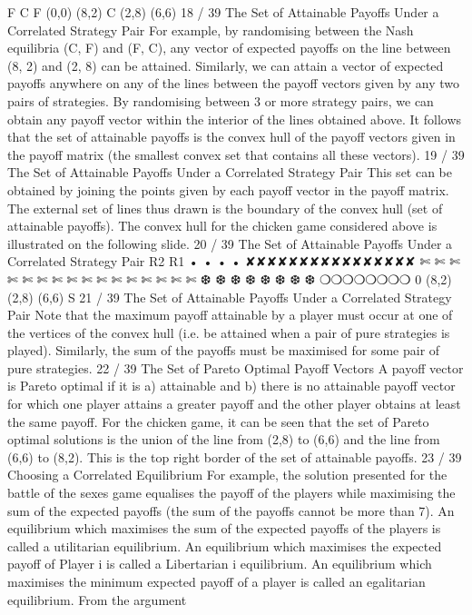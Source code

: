 F C
F (0,0) (8,2)
C (2,8) (6,6)
18 / 39
The Set of Attainable Payoffs Under a Correlated Strategy
Pair
For example, by randomising between the Nash equilibria (C, F)
and (F, C), any vector of expected payoffs on the line between
(8, 2) and (2, 8) can be attained.
Similarly, we can attain a vector of expected payoffs anywhere on
any of the lines between the payoff vectors given by any two pairs
of strategies.
By randomising between 3 or more strategy pairs, we can obtain
any payoff vector within the interior of the lines obtained above.
It follows that the set of attainable payoffs is the convex hull of the
payoff vectors given in the payoff matrix (the smallest convex set
that contains all these vectors).
19 / 39
The Set of Attainable Payoffs Under a Correlated Strategy
Pair
This set can be obtained by joining the points given by each payoff
vector in the payoff matrix.
The external set of lines thus drawn is the boundary of the convex
hull (set of attainable payoffs).
The convex hull for the chicken game considered above is
illustrated on the following slide.
20 / 39
The Set of Attainable Payoffs Under a Correlated Strategy
Pair
R2
R1
•
•
•
•
✘✘✘✘✘✘✘✘✘✘✘✘✘✘✘✘
✄
✄
✄
✄
✄
✄
✄
✄
✄
✄
✄
✄
✄
✄
✄
✄
❆
❆
❆
❆
❆
❆
❆
❆
❍❍❍❍❍❍❍❍
0
(8,2)
(2,8)
(6,6)
S
21 / 39
The Set of Attainable Payoffs Under a Correlated Strategy
Pair
Note that the maximum payoff attainable by a player must occur
at one of the vertices of the convex hull (i.e. be attained when a
pair of pure strategies is played).
Similarly, the sum of the payoffs must be maximised for some pair
of pure strategies.
22 / 39
The Set of Pareto Optimal Payoff Vectors
A payoff vector is Pareto optimal if it is a) attainable and b) there
is no attainable payoff vector for which one player attains a greater
payoff and the other player obtains at least the same payoff.
For the chicken game, it can be seen that the set of Pareto optimal
solutions is the union of the line from (2,8) to (6,6) and the line
from (6,6) to (8,2). This is the top right border of the set of
attainable payoffs.
23 / 39
Choosing a Correlated Equilibrium
For example, the solution presented for the battle of the sexes
game equalises the payoff of the players while maximising the sum
of the expected payoffs (the sum of the payoffs cannot be more
than 7).
An equilibrium which maximises the sum of the expected payoffs of
the players is called a utilitarian equilibrium.
An equilibrium which maximises the expected payoff of Player i is
called a Libertarian i equilibrium.
An equilibrium which maximises the minimum expected payoff of a
player is called an egalitarian equilibrium. From the argument
